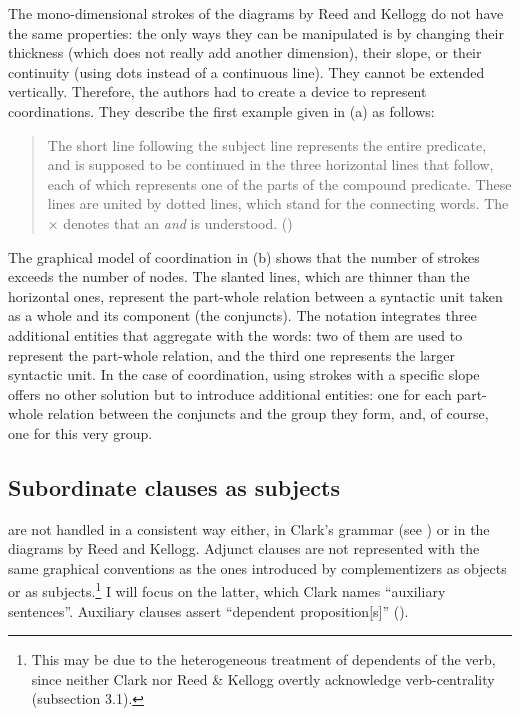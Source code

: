 \documentclass[output=paper]{langsci/langscibook}
\begin{document}
The mono-dimensional strokes of the diagrams by Reed and Kellogg do not have the same properties: the only ways they can be manipulated is by changing their thickness (which does not really add another dimension), their slope, or their continuity (using dots instead of a continuous line). They cannot be extended vertically. Therefore, the authors had to create a device to represent coordinations. They describe the first example given in (a) as follows:

\begin{quote}
The short line following the subject line represents the entire predicate, and is supposed to be continued in the three horizontal lines that follow, each of which represents one of the parts of the compound predicate. These lines are united by dotted lines, which stand for the connecting words. The × denotes that an \textit{and} is understood. (\citealt[47-48]{reed_graded_1879})
\end{quote}

The graphical model of coordination in (b) shows that the number of strokes exceeds the number of nodes. The slanted lines, which are thinner than the horizontal ones, represent the part-whole relation between a syntactic unit taken as a whole and its component (the conjuncts). The notation integrates three additional entities that aggregate with the words: two of them are used to represent the part-whole relation, and the third one represents the larger syntactic unit. In the case of coordination, using strokes with a specific slope offers no other solution but to introduce additional entities: one for each part-whole relation between the conjuncts and the group they form, and, of course, one for this very group.

\subsection{Subordinate clauses as subjects}

 are not handled in a consistent way either, in Clark’s grammar  (see \citealt[319-322 and 328-329]{mazziotta_drawing_2016}) or in the diagrams by Reed and Kellogg. Adjunct clauses are not represented with the same graphical conventions as the ones introduced by complementizers as objects or as subjects.\footnote{ \textrm{This may be due to the heterogeneous treatment of dependents of the verb, since neither Clark nor Reed \& Kellogg overtly acknowledge verb-centrality (subsection 3.1).}} I will focus on the latter, which Clark names “auxiliary sentences”. Auxiliary clauses assert “dependent proposition[s]” (\citeyear[187]{clark_normal_1870}).
\end{document}
